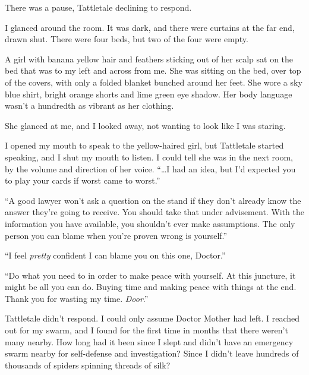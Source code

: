 There was a pause, Tattletale declining to respond.



I glanced around the room.  It was dark, and there were curtains at the far end, drawn shut.  There were four beds, but two of the four were empty.



A girl with banana yellow hair and feathers sticking out of her scalp sat on the bed that was to my left and across from me.  She was sitting on the bed, over top of the covers, with only a folded blanket bunched around her feet.  She wore a sky blue shirt, bright orange shorts and lime green eye shadow. Her body language wasn't a hundredth as vibrant as her clothing.



She glanced at me, and I looked away, not wanting to look like I was staring.



I opened my mouth to speak to the yellow-haired girl, but Tattletale started speaking, and I shut my mouth to listen.  I could tell she was in the next room, by the volume and direction of her voice.  ``\ldots{}I had an idea, but I'd expected you to play your cards if worst came to worst.''



``A good lawyer won't ask a question on the stand if they don't already know the answer they're going to receive.  You should take that under advisement.  With the information you have available, you shouldn't ever make assumptions.  The only person you can blame when you're proven wrong is yourself.''



``I feel\emph{ pretty} confident I can blame you on this one, Doctor.''



``Do what you need to in order to make peace with yourself.  At this juncture, it might be all you can do.  Buying time and making peace with things at the end.  Thank you for wasting my time.  \emph{Door}.''



Tattletale didn't respond.  I could only assume Doctor Mother had left.  I reached out for my swarm, and I found for the first time in months that there weren't many nearby.  How long had it been since I slept and didn't have an emergency swarm nearby for self-defense and investigation?  Since I didn't leave hundreds of thousands of spiders spinning threads of silk?



